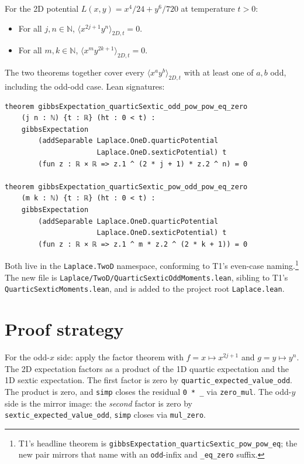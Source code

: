 \documentclass[11pt]{article}
\begin{document}
For the 2D potential $L(x, y) = x^4/24 + y^6/720$ at temperature
$t > 0$:

\begin{itemize}[leftmargin=1.5em]
\item For all $j, n \in \mathbb N$,
  $\langle x^{2j+1} y^n \rangle_{2D, t} = 0$.
\item For all $m, k \in \mathbb N$,
  $\langle x^m y^{2k+1} \rangle_{2D, t} = 0$.
\end{itemize}

The two theorems together cover every $\langle x^a y^b \rangle_{2D, t}$
with at least one of $a, b$ odd, including the odd-odd case. Lean
signatures:

\begin{verbatim}
theorem gibbsExpectation_quarticSextic_odd_pow_pow_eq_zero
    (j n : ℕ) {t : ℝ} (ht : 0 < t) :
    gibbsExpectation
        (addSeparable Laplace.OneD.quarticPotential
                      Laplace.OneD.sexticPotential) t
        (fun z : ℝ × ℝ => z.1 ^ (2 * j + 1) * z.2 ^ n) = 0

theorem gibbsExpectation_quarticSextic_pow_odd_pow_eq_zero
    (m k : ℕ) {t : ℝ} (ht : 0 < t) :
    gibbsExpectation
        (addSeparable Laplace.OneD.quarticPotential
                      Laplace.OneD.sexticPotential) t
        (fun z : ℝ × ℝ => z.1 ^ m * z.2 ^ (2 * k + 1)) = 0
\end{verbatim}

Both live in the \texttt{Laplace.TwoD} namespace, conforming to
T1's even-case naming.\footnote{T1's headline theorem is
\texttt{gibbsExpectation\_quarticSextic\_pow\_pow\_eq}; the new pair
mirrors that name with an \texttt{odd}-infix and \texttt{\_eq\_zero}
suffix.} The new file is
\texttt{Laplace/TwoD/QuarticSexticOddMoments.lean}, sibling to T1's
\texttt{QuarticSexticMoments.lean}, and is added to the project root
\texttt{Laplace.lean}.

\section{Proof strategy}

For the odd-$x$ side: apply the factor theorem with
$f = x \mapsto x^{2j+1}$ and $g = y \mapsto y^n$. The 2D expectation
factors as a product of the 1D quartic expectation and the 1D sextic
expectation. The first factor is zero by
\texttt{quartic\_expected\_value\_odd}. The product is zero, and
\texttt{simp} closes the residual \texttt{0 * \_} via
\texttt{zero\_mul}. The odd-$y$ side is the mirror image: the
\emph{second} factor is zero by \texttt{sextic\_expected\_value\_odd},
\texttt{simp} closes via \texttt{mul\_zero}.
\end{document}
